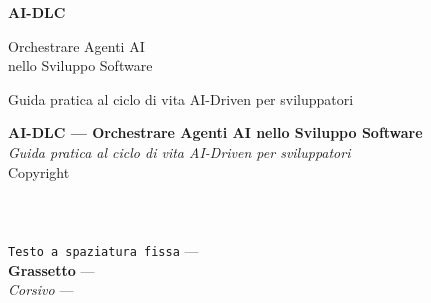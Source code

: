 ﻿%

\begin{titlepage}
  \centering
  \vspace*{3cm}
  {\fontsize{32}{38}\selectfont\sffamily\bfseries\color{manning-dark}
    AI-DLC\par}
  \vspace{0.5cm}
  {\fontsize{20}{26}\selectfont\sffamily\color{manning-gray}
    Orchestrare Agenti AI\\nello Sviluppo Software\par}
  \vspace{1cm}
  {\large\sffamily Guida pratica al ciclo di vita AI-Driven per sviluppatori\par}
  \vfill
  {\large\sffamily\textbf{\BookAuthor}\par}
  \vspace{0.5cm}
  {\sffamily\color{manning-gray}\BookYear\par}
\end{titlepage}

\thispagestyle{empty}
\vspace*{\fill}
{\small
\textbf{AI-DLC --- Orchestrare Agenti AI nello Sviluppo Software}\\
\textit{Guida pratica al ciclo di vita AI-Driven per sviluppatori}\\[1em]
Copyright \textcopyright\ \BookYear\ \BookAuthor\\[0.5em]
\LabelAllRightsReserved\\[1em]
\LabelCopyrightNotice\\[1em]
\textbf{\LabelTypographicConventions}\\[0.3em]
\texttt{Testo a spaziatura fissa} --- \LabelCodeDesc\\
\textbf{Grassetto} --- \LabelBoldDesc\\
\textit{Corsivo} --- \LabelItalicDesc
}
\clearpage
